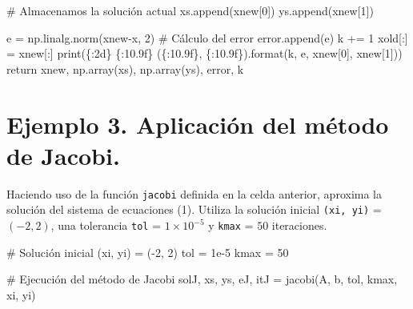 \documentclass[
  letterpaper,
  DIV=11,
  numbers=noendperiod]{scrreprt}
\newenvironment{Shaded}{\begin{snugshade}}{\end{snugshade}}
\newcommand{\BuiltInTok}[1]{\textcolor[rgb]{0.00,0.23,0.31}{#1}}
\newcommand{\CommentTok}[1]{\textcolor[rgb]{0.37,0.37,0.37}{#1}}
\newcommand{\ControlFlowTok}[1]{\textcolor[rgb]{0.00,0.23,0.31}{#1}}
\newcommand{\DecValTok}[1]{\textcolor[rgb]{0.68,0.00,0.00}{#1}}
\newcommand{\FloatTok}[1]{\textcolor[rgb]{0.68,0.00,0.00}{#1}}
\newcommand{\NormalTok}[1]{\textcolor[rgb]{0.00,0.23,0.31}{#1}}
\newcommand{\OperatorTok}[1]{\textcolor[rgb]{0.37,0.37,0.37}{#1}}
\newcommand{\SpecialCharTok}[1]{\textcolor[rgb]{0.37,0.37,0.37}{#1}}
\newcommand{\StringTok}[1]{\textcolor[rgb]{0.13,0.47,0.30}{#1}}
\begin{document}
\begin{Shaded}
\begin{Highlighting}[]
        \CommentTok{\# Almacenamos la solución actual}
\NormalTok{        xs.append(xnew[}\DecValTok{0}\NormalTok{])}
\NormalTok{        ys.append(xnew[}\DecValTok{1}\NormalTok{])}
        
\NormalTok{        e }\OperatorTok{=}\NormalTok{ np.linalg.norm(xnew}\OperatorTok{{-}}\NormalTok{x, }\DecValTok{2}\NormalTok{) }\CommentTok{\# Cálculo del error}
\NormalTok{        error.append(e)}
\NormalTok{        k }\OperatorTok{+=} \DecValTok{1}
\NormalTok{        xold[:] }\OperatorTok{=}\NormalTok{ xnew[:]}
        \BuiltInTok{print}\NormalTok{(}\StringTok{\textquotesingle{}}\SpecialCharTok{\{:2d\}}\StringTok{ }\SpecialCharTok{\{:10.9f\}}\StringTok{ (}\SpecialCharTok{\{:10.9f\}}\StringTok{, }\SpecialCharTok{\{:10.9f\}}\StringTok{)\textquotesingle{}}\NormalTok{.}\BuiltInTok{format}\NormalTok{(k, e, xnew[}\DecValTok{0}\NormalTok{], xnew[}\DecValTok{1}\NormalTok{]))}
    \ControlFlowTok{return}\NormalTok{ xnew, np.array(xs), np.array(ys), error, k}
\end{Highlighting}
\end{Shaded}

\section{\texorpdfstring{\textbf{Ejemplo 3. Aplicación del método de
Jacobi.}}{Ejemplo 3. Aplicación del método de Jacobi.}}\label{ejemplo-3.-aplicaciuxf3n-del-muxe9todo-de-jacobi.}

Haciendo uso de la función \texttt{jacobi} definida en la celda
anterior, aproxima la solución del sistema de ecuaciones (1). Utiliza la
solución inicial \texttt{(xi,\ yi)} = \((-2, 2)\), una tolerancia
\texttt{tol} = \(1 \times 10^{-5}\) y \texttt{kmax} = \(50\)
iteraciones.

\begin{Shaded}
\begin{Highlighting}[]
\CommentTok{\# Solución inicial}
\NormalTok{(xi, yi) }\OperatorTok{=}\NormalTok{ (}\OperatorTok{{-}}\DecValTok{2}\NormalTok{, }\DecValTok{2}\NormalTok{)}
\NormalTok{tol }\OperatorTok{=} \FloatTok{1e{-}5}
\NormalTok{kmax }\OperatorTok{=} \DecValTok{50}

\CommentTok{\# Ejecución del método de Jacobi}
\NormalTok{solJ, xs, ys, eJ, itJ }\OperatorTok{=}\NormalTok{ jacobi(A, b, tol, kmax, xi, yi)}
\end{Highlighting}
\end{Shaded}
\end{document}
